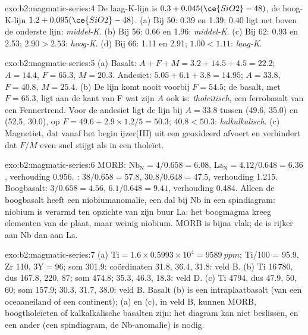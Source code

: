 \begin{solution}{exo:b2:magmatic-series:4}
De laag-K-lijn is $0.3 + 0.045(\ce{SiO2} - 48)$, de hoog-K-lijn $1.2 +
0.095(\ce{SiO2} - 48)$. (a) Bij 50: 0.39 en 1.39; $0.40$ ligt net boven de onderste lijn:
\emph{middel-K}. (b) Bij 56: 0.66 en 1.96: \emph{middel-K}. (c) Bij 62: 0.93 en 2.53;
$2.90 > 2.53$: \emph{hoog-K}. (d) Bij 66: 1.11 en 2.91; $1.00 < 1.11$: \emph{laag-K}.
\end{solution}

\begin{solution}{exo:b2:magmatic-series:5}
(a) Basalt: $A + F + M = 3.2 + 14.5 + 4.5 = 22.2$; $A = 14.4$, $F = 65.3$, $M = 20.3$.
Andesiet: $5.05 + 6.1 + 3.8 = 14.95$; $A = 33.8$, $F = 40.8$, $M = 25.4$. (b) De lijn
komt nooit voorbij $F = 54.5$; de basalt, met $F = 65.3$, ligt aan de kant van F
wat zijn $A$ ook is: \emph{tholeïtisch}, een ferrobasalt van een Fennertrend. Voor de
andesiet ligt de lijn bij $A = 33.8$ tussen (49.6, 35.0) en (52.5, 30.0), op $F =
49.6 + 2.9\times1.2/5 = 50.3$; $40.8 < 50.3$: \emph{kalkalkalisch}. (c) Magnetiet,
dat vanaf het begin ijzer(III) uit een geoxideerd  afvoert en verhindert dat $F/M$
even snel stijgt als in een tholeïet.
\end{solution}

\begin{solution}{exo:b2:magmatic-series:6}
MORB: $\mathrm{Nb_N} = 4/0.658 = 6.08$, $\mathrm{La_N} = 4.12/0.648 = 6.36$, verhouding
0.956. : $38/0.658 = 57.8$, $30.8/0.648 = 47.5$, verhouding 1.215.
Boogbasalt: $3/0.658 = 4.56$, $6.1/0.648 = 9.41$, verhouding 0.484. Alleen de boogbasalt heeft een
niobiumanomalie, een dal bij Nb in een spindiagram: niobium is verarmd ten opzichte van
zijn buur La: het boogmagma kreeg elementen van de plaat, maar weinig
niobium. MORB is bijna vlak; de  is rijker
aan Nb dan aan La.
\end{solution}

\begin{solution}{exo:b2:magmatic-series:7}
(a) $\mathrm{Ti} = 1.6\times0.5993\times10^4 = \qty{9589}{ppm}$; Ti/100 = 95.9, Zr
110, $3\mathrm Y = 96$; som 301.9; coördinaten 31.8, 36.4, 31.8: veld B. (b) Ti
16\,780, dus 167.8, 220, 87; som 474.8; 35.3, 46.3, 18.3: veld D. (c) Ti 4794, dus
47.9, 50, 60; som 157.9; 30.3, 31.7, 38.0: veld B. Basalt (b) is een intraplaatbasalt
(van een oceaaneiland of een continent); (a) en (c), in veld B, kunnen MORB,
boogtholeïeten of kalkalkalische basalten zijn: het diagram kan niet beslissen, en een ander (een
spindiagram, de Nb-anomalie) is nodig.
\end{solution}

